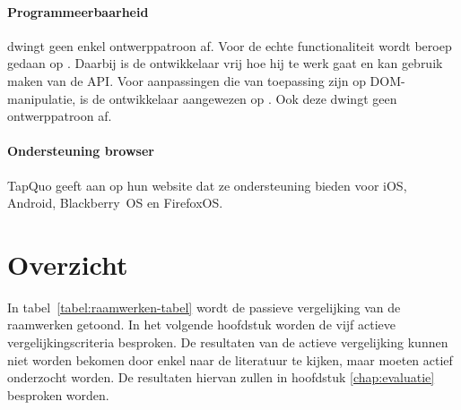 \paragraph{Programmeerbaarheid}
\label{sec:lungo-programeerbaarheid}
\lungo{} dwingt geen enkel ontwerppatroon af.
Voor de echte functionaliteit wordt beroep gedaan op \js{}.
Daarbij is de ontwikkelaar vrij hoe hij te werk gaat en kan gebruik maken van de \lungo{} API. 
Voor aanpassingen die van toepassing zijn op DOM-manipulatie, is de ontwikkelaar aangewezen op \quo{}.
Ook deze dwingt geen ontwerppatroon af.

\paragraph{Ondersteuning browser}
TapQuo geeft aan op hun website dat ze ondersteuning bieden voor iOS, Android, Blackberry~OS en FirefoxOS.


\section{Overzicht}
\label{sec:raamwerken-tabel}

In tabel~\ref{tabel:raamwerken-tabel} wordt de passieve vergelijking van de raamwerken getoond.
In het volgende hoofdstuk worden de vijf actieve vergelijkingscriteria besproken.
De resultaten van de actieve vergelijking kunnen niet worden bekomen door enkel naar de literatuur te kijken, maar moeten actief onderzocht worden.
De resultaten hiervan zullen in hoofdstuk \ref{chap:evaluatie} besproken worden.

\begin{landscape}
\begin{table}[H]
\centering
{}
\caption{Passieve vergelijking van \st{}, \kendo{}, \jqm{} en \lungo{}}
\label{tabel:raamwerken-tabel}
\end{table}
\end{landscape}
